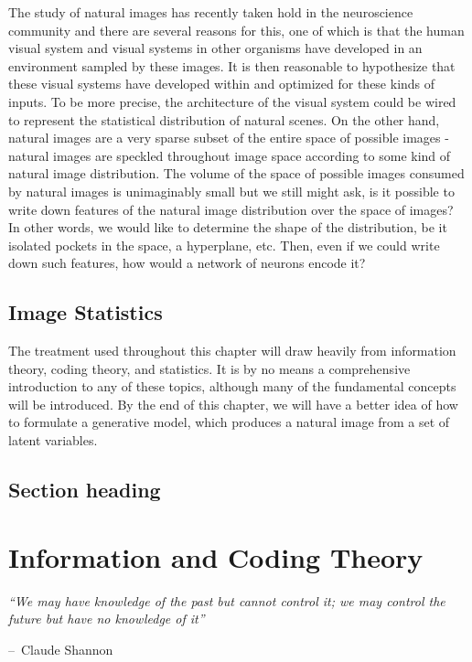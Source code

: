 \documentclass[a4paper,11pt]{book}
\makeatletter
\newenvironment{chapquote}[2][2em]
  {\setlength{\@tempdima}{#1}%
   \def\chapquote@author{#2}%
   \parshape 1 \@tempdima \dimexpr\textwidth-2\@tempdima\relax%
   \itshape}
  {\par\normalfont\hfill--\ \chapquote@author\hspace*{\@tempdima}\par\bigskip}
\makeatother
\begin{document}
The study of natural images has recently taken hold in the neuroscience community and there are several reasons for this, one of which is that the human visual system and visual systems in other organisms have developed in an environment sampled by these images. It is then reasonable to hypothesize that these visual systems have developed within and optimized for these kinds of inputs. To be more precise, the architecture of the visual system could be wired to represent the statistical distribution of natural scenes. On the other hand, natural images are a very sparse subset of the entire space of possible images - natural images are speckled throughout image space according to some kind of natural image distribution. The volume of the space of possible images consumed by natural images is unimaginably small but we still might ask, is it possible to write down features of the natural image distribution over the space of images? In other words, we would like to determine the shape of the distribution, be it isolated pockets in the space, a hyperplane, etc. Then, even if we could write down such features, how would a network of neurons encode it?

\section{Image Statistics}

The treatment used throughout this chapter will draw heavily from information theory, coding theory, and statistics. It is by no means a comprehensive introduction to any of these topics, although many of the fundamental concepts will be introduced. By the end of this chapter, we will have a better idea of how to formulate a generative model, which produces a natural image from a set of latent variables.

\section{Section heading}

\chapter{Information and Coding Theory}

\begin{chapquote}{Claude Shannon}
``We may have knowledge of the past but cannot control it; we may control the future but have no knowledge of it''
\end{chapquote}
\end{document}
